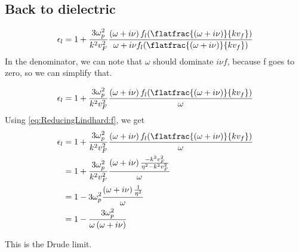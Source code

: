 \documentclass[../../main.tex]{subfiles}
\newcommand{\vf}{v_F}
\begin{document}
\subsection{Back to dielectric}
\begin{equation} \label{eq:ReducingLindhard:EpsWithF} 
 \epsilon_l = 1 + \frac{3 \omega_p^2}{k^2 v_F^2} \frac{\left(\omega + i \nu \right) f_l(\flatfrac{(\omega + i \nu)}{k v_f})}{\omega + i \nu f_l(\flatfrac{(\omega + i \nu)}{k v_f})}
\end{equation}
In the denominator, we can note that $\omega$ should dominate $i \nu f$, because f goes to zero, so we can simplify that. 

\begin{equation}
	 \epsilon_l = 1 + \frac{3 \omega_p^2}{k^2 v_F^2} \frac{\left(\omega + i \nu \right) f_l(\flatfrac{(\omega + i \nu)}{k v_f})}{\omega}
\end{equation}
Using \eqref{eq:ReducingLindhard:f}, we get
\begin{align}
	\epsilon_l &= 1 + \frac{3 \omega_p^2}{k^2 v_F^2} \frac{\left(\omega + i \nu \right) f_l(\flatfrac{(\omega + i \nu)}{k v_f})}{\omega} \\
	&= 1 + \frac{3 \omega_p^2}{k^2 v_F^2} \frac{\left(\omega + i \nu \right) \frac{-k^2 \vf^2}{\eta^2 - k^2 \vf^2}}{\omega} \\
	&= 1 - 3 \omega_p^2 \frac{\left(\omega + i \nu \right) \frac{1}{\eta^2}}{\omega} \\
	&= 1 - \frac{3 \omega_p^2}{\omega \left( \omega + i \nu \right)}
\end{align}

This is the Drude limit.
\end{document}
